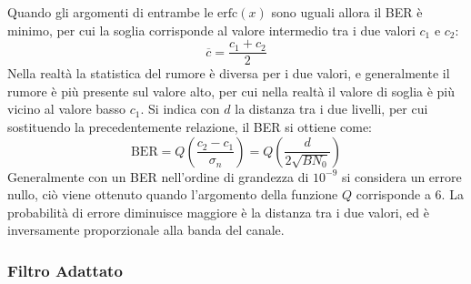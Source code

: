 \documentclass{article}
\numberwithin{equation}{subsection}
\begin{document}
Quando gli argomenti di entrambe le $\mathrm{erfc}(x)$ sono uguali allora il BER è minimo, per cui la soglia corrisponde al valore intermedio tra i due valori $c_1$ e $c_2$:
\begin{equation}
    \overline{c}=\displaystyle\frac{c_1+c_2}{2}
\end{equation}
Nella realtà la statistica del rumore è diversa per i due valori, e generalmente il rumore è più presente sul valore alto, per cui nella realtà il valore di soglia è 
più vicino al valore basso $c_1$.  
Si indica con $d$ la distanza tra i due livelli, per cui sostituendo la precedentemente relazione, il BER si ottiene come:
\begin{equation}
    \mathrm{BER}=Q\left(\frac{c_2-c_1}{\sigma_n}\right)=Q\left(\frac{d}{2\sqrt{BN_0}}\right)
\end{equation}
Generalmente con un BER nell'ordine di grandezza di $10^{-9}$ si considera un errore nullo, ciò viene ottenuto quando l'argomento della funzione $Q$ corrisponde a $6$. 
La probabilità di errore diminuisce maggiore è la distanza tra i due valori, ed è inversamente proporzionale alla banda del canale. 

\subsubsection{Filtro Adattato}
\end{document}
